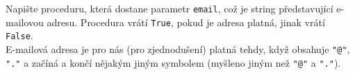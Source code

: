 \question[50]
Napište proceduru, která dostane parametr \texttt{email}, což je string
představující e-mailovou adresu. Procedura vrátí \texttt{True}, pokud je adresa
platná, jinak vrátí \texttt{False}.\\
E-mailová adresa je pro nás (pro zjednodušení) platná tehdy, když obsahuje
\texttt{"@"}, \texttt{"."} a začíná a končí nějakým jiným symbolem (myšleno
jiným než \texttt{"@"} a \texttt{"."}).